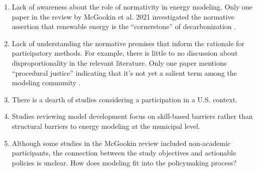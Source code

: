 \begin{enumerate}
    \item Lack of awareness about the role of normativity in energy modeling. Only one 
    paper in the review by McGookin et al. 2021 investigated the normative assertion 
    that renewable energy is the ``cornerstone'' of decarbonization \cite{zelt_long-term_2019}.
    \item Lack of understanding the normative premises that inform the rationale
    for participatory methods. For example, there is little to no discussion about 
    disproportionality in the relevant literature. Only one paper mentions ``procedural justice''
    indicating that it's not yet a salient term among the modeling community \cite{knudsen_local_2015}.
    \item There is a dearth of studies considering a participation in a U.S. context.
    \item Studies reviewing model development focus on skill-based barriers rather than
    structural barriers to energy modeling at the municipal level.
    \item Although some studies in the McGookin review included non-academic participants, the
    connection between the study objectives and actionable policies is unclear. How does modeling
    fit into the policymaking process?
\end{enumerate}

